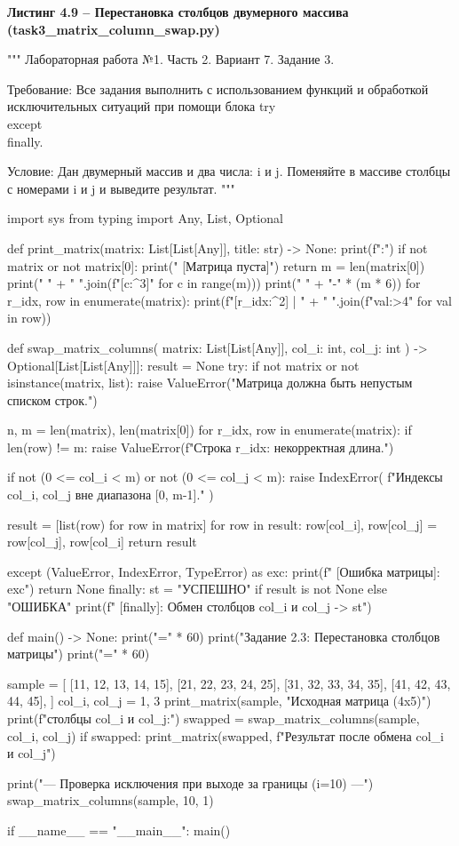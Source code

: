 \documentclass[14pt,a4paper]{extarticle}
\newcommand{\listingtitle}[1]{%
  \par\vspace{8pt}%
  \noindent\hspace*{1.25cm}\textbf{#1}\par\vspace{2pt}%
}
\begin{document}
\listingtitle{Листинг 4.9 -- Перестановка столбцов двумерного массива (task3\_matrix\_column\_swap.py)}
\begin{CodeListing}
"""
Лабораторная работа №1. Часть 2.
Вариант 7. Задание 3.

Требование:
Все задания выполнить с использованием функций и обработкой
исключительных ситуаций при помощи блока try\\except\\finally.

Условие:
Дан двумерный массив и два числа: i и j. Поменяйте в массиве столбцы
с номерами i и j и выведите результат.
"""

import sys
from typing import Any, List, Optional


def print_matrix(matrix: List[List[Any]], title: str) -> None:
    print(f":")
    if not matrix or not matrix[0]:
        print("  [Матрица пуста]")
        return
    m = len(matrix[0])
    print("      " + " ".join(f"[{c:^3}]" for c in range(m)))
    print("      " + "-" * (m * 6))
    for r_idx, row in enumerate(matrix):
        print(f"[{r_idx:^2}] | " + " ".join(f"{val:>4}" for val in row))


def swap_matrix_columns(
    matrix: List[List[Any]], col_i: int, col_j: int
) -> Optional[List[List[Any]]]:
    result = None
    try:
        if not matrix or not isinstance(matrix, list):
            raise ValueError("Матрица должна быть непустым списком строк.")

        n, m = len(matrix), len(matrix[0])
        for r_idx, row in enumerate(matrix):
            if len(row) != m:
                raise ValueError(f"Строка {r_idx}: некорректная длина.")

        if not (0 <= col_i < m) or not (0 <= col_j < m):
            raise IndexError(
                f"Индексы {col_i}, {col_j} вне диапазона [0, {m-1}]."
            )

        result = [list(row) for row in matrix]
        for row in result:
            row[col_i], row[col_j] = row[col_j], row[col_i]
        return result

    except (ValueError, IndexError, TypeError) as exc:
        print(f"  [Ошибка матрицы]: {exc}")
        return None
    finally:
        st = "УСПЕШНО" if result is not None else "ОШИБКА"
        print(f"  [finally]: Обмен столбцов {col_i} и {col_j} -> {st}")


def main() -> None:
    print("=" * 60)
    print("Задание 2.3: Перестановка столбцов матрицы")
    print("=" * 60)

    sample = [
        [11, 12, 13, 14, 15],
        [21, 22, 23, 24, 25],
        [31, 32, 33, 34, 35],
        [41, 42, 43, 44, 45],
    ]
    col_i, col_j = 1, 3
    print_matrix(sample, "Исходная матрица (4x5)")
    print(f" столбцы {col_i} и {col_j}:")
    swapped = swap_matrix_columns(sample, col_i, col_j)
    if swapped:
        print_matrix(swapped, f"Результат после обмена {col_i} и {col_j}")

    print("\n--- Проверка исключения при выходе за границы (i=10) ---")
    swap_matrix_columns(sample, 10, 1)


if __name__ == "__main__":
    main()
\end{CodeListing}
\end{document}
